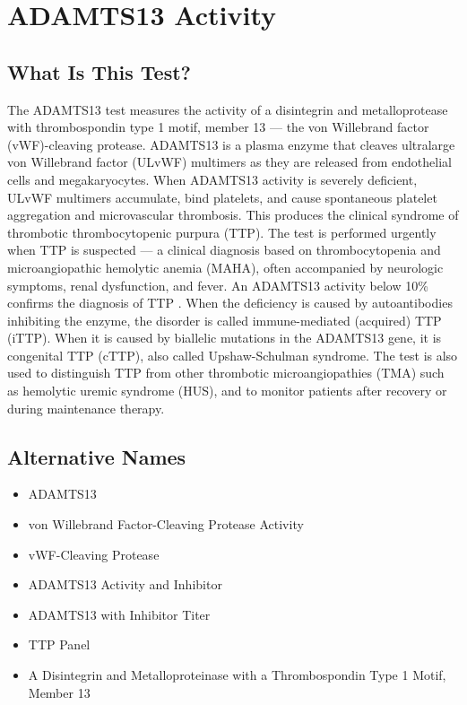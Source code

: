 \chapter{ADAMTS13 Activity}

\section*{What Is This Test?}
The ADAMTS13 test measures the activity of a disintegrin and metalloprotease with thrombospondin type 1 motif, member 13 --- the von Willebrand factor (vWF)-cleaving protease. ADAMTS13 is a plasma enzyme that cleaves ultralarge von Willebrand factor (ULvWF) multimers as they are released from endothelial cells and megakaryocytes. When ADAMTS13 activity is severely deficient, ULvWF multimers accumulate, bind platelets, and cause spontaneous platelet aggregation and microvascular thrombosis. This produces the clinical syndrome of thrombotic thrombocytopenic purpura (TTP). The test is performed urgently when TTP is suspected --- a clinical diagnosis based on thrombocytopenia and microangiopathic hemolytic anemia (MAHA), often accompanied by neurologic symptoms, renal dysfunction, and fever. An ADAMTS13 activity below 10\% confirms the diagnosis of TTP \cite{joly2017thrombotic}. When the deficiency is caused by autoantibodies inhibiting the enzyme, the disorder is called immune-mediated (acquired) TTP (iTTP). When it is caused by biallelic mutations in the ADAMTS13 gene, it is congenital TTP (cTTP), also called Upshaw-Schulman syndrome. The test is also used to distinguish TTP from other thrombotic microangiopathies (TMA) such as hemolytic uremic syndrome (HUS), and to monitor patients after recovery or during maintenance therapy.

\section*{Alternative Names}
\begin{itemize}
  \item ADAMTS13
  \item von Willebrand Factor-Cleaving Protease Activity
  \item vWF-Cleaving Protease
  \item ADAMTS13 Activity and Inhibitor
  \item ADAMTS13 with Inhibitor Titer
  \item TTP Panel
  \item A Disintegrin and Metalloproteinase with a Thrombospondin Type 1 Motif, Member 13
\end{itemize}
